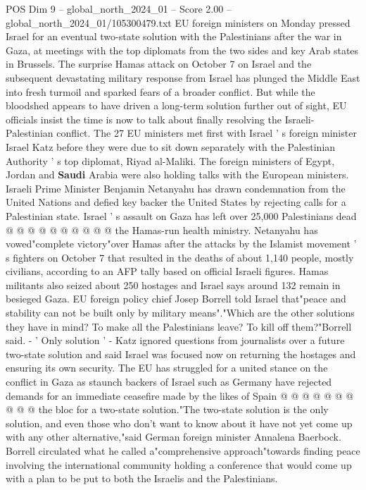 \begin{textsample}{POS Dim 9 – global\_north\_2024\_01 – Score 2.00 – global\_north\_2024\_01/105300479.txt}  \label{ex:f9_pos_247}
EU foreign ministers on Monday pressed Israel for an eventual two-state solution with the Palestinians after the war in Gaza, at meetings with the top diplomats from the two sides and key Arab states in Brussels.
The surprise Hamas attack on October 7 on Israel and the subsequent devastating military response from Israel has plunged the Middle East into fresh turmoil and sparked fears of a broader conflict.
But while the bloodshed appears to have driven a long-term solution further out of sight, EU officials insist the time is now to talk about finally resolving the Israeli-Palestinian conflict.
The 27 EU ministers met first with Israel ' s foreign minister Israel Katz before they were due to sit down separately with the Palestinian Authority ' s top diplomat, Riyad al-Maliki.
The foreign ministers of Egypt, Jordan and \textbf{Saudi} Arabia were also holding talks with the European ministers.
Israeli Prime Minister Benjamin Netanyahu has drawn condemnation from the United Nations and defied key backer the United States by rejecting calls for a Palestinian state.
Israel ' s assault on Gaza has left over 25,000 Palestinians dead @ @ @ @ @ @ @ @ @ @ the Hamas-run health ministry.
Netanyahu has vowed"complete victory"over Hamas after the attacks by the Islamist movement ' s fighters on October 7 that resulted in the deaths of about 1,140 people, mostly civilians, according to an AFP tally based on official Israeli figures.
Hamas militants also seized about 250 hostages and Israel says around 132 remain in besieged Gaza.
EU foreign policy chief Josep Borrell told Israel that"peace and stability can not be built only by military means"."Which are the other solutions they have in mind?
To make all the Palestinians leave?
To kill off them?"Borrell said. - ' Only solution ' - Katz ignored questions from journalists over a future two-state solution and said Israel was focused now on returning the hostages and ensuring its own security.
The EU has struggled for a united stance on the conflict in Gaza as staunch backers of Israel such as Germany have rejected demands for an immediate ceasefire made by the likes of Spain @ @ @ @ @ @ @ @ @ @ the bloc for a two-state solution."The two-state solution is the only solution, and even those who don't want to know about it have not yet come up with any other alternative,"said German foreign minister Annalena Baerbock.
Borrell circulated what he called a"comprehensive approach"towards finding peace involving the international community holding a conference that would come up with a plan to be put to both the Israelis and the Palestinians.

\end{textsample}
